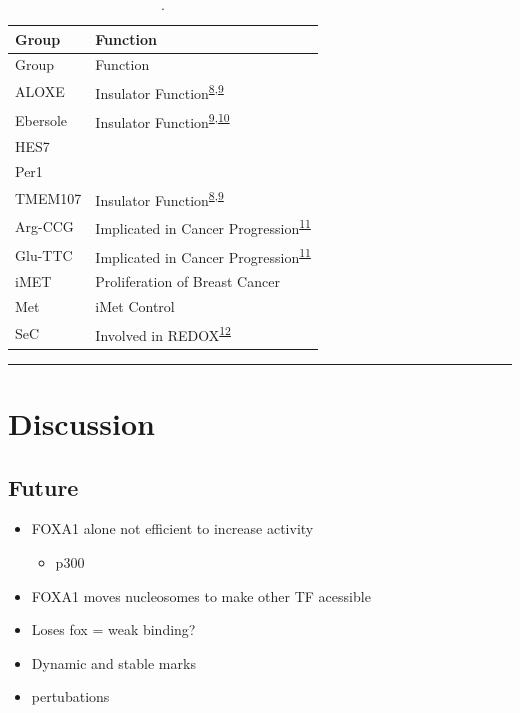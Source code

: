 \documentclass[
  12pt,
]{article}
\providecommand{\tightlist}{%
  \setlength{\itemsep}{0pt}\setlength{\parskip}{0pt}}
\begin{document}
\begin{longtable}[]{@{}ll@{}}
\caption{\label{tab:clusters}.}\tabularnewline
\toprule()
Group & Function \\
\midrule()
\endfirsthead
\toprule()
Group & Function \\
\midrule()
\endhead
ALOXE & Insulator Function\textsuperscript{\protect\hyperlink{ref-raab2011}{8},\protect\hyperlink{ref-sizer2022}{9}} \\
Ebersole & Insulator Function\textsuperscript{\protect\hyperlink{ref-sizer2022}{9},\protect\hyperlink{ref-Ebersole2011}{10}} \\
HES7 & \\
Per1 & \\
TMEM107 & Insulator Function\textsuperscript{\protect\hyperlink{ref-raab2011}{8},\protect\hyperlink{ref-sizer2022}{9}} \\
Arg-CCG & Implicated in Cancer Progression\textsuperscript{\protect\hyperlink{ref-Goodarzi2016}{11}} \\
Glu-TTC & Implicated in Cancer Progression\textsuperscript{\protect\hyperlink{ref-Goodarzi2016}{11}} \\
iMET & Proliferation of Breast Cancer \\
Met & iMet Control \\
SeC & Involved in REDOX\textsuperscript{\protect\hyperlink{ref-Sangha2022}{12}} \\
\bottomrule()
\end{longtable}

\begin{center}\rule{0.5\linewidth}{0.5pt}\end{center}

\hypertarget{discussion}{%
\section{Discussion}\label{discussion}}

\hypertarget{future}{%
\subsection{Future}\label{future}}

\begin{itemize}
\item
  FOXA1 alone not efficient to increase activity

  \begin{itemize}
  \tightlist
  \item
    p300
  \end{itemize}
\item
  FOXA1 moves nucleosomes to make other TF acessible
\item
  Loses fox = weak binding?
\item
  Dynamic and stable marks
\item
  pertubations
\end{itemize}
\end{document}
